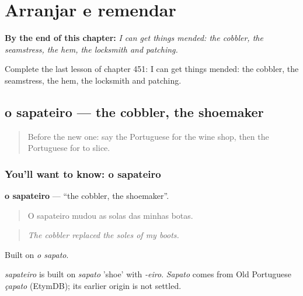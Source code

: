 
\chapter{Arranjar e remendar}
\label{ch:pt-arranjar-e-remendar}

\begin{chapteropening}
\textbf{By the end of this chapter:} \emph{I can get things mended: the cobbler, the seamstress, the hem, the locksmith and patching.}

Complete the last lesson of chapter 451: I can get things mended: the cobbler, the seamstress, the hem, the locksmith and patching.
\end{chapteropening}

\section[o sapateiro]{o sapateiro — the cobbler, the shoemaker}

\label{lesson:PT-C451-sapateiro}



\begin{quote}
Before the new one: say the Portuguese for the wine shop, then the Portuguese for to slice.
\end{quote}

\subsection*{You'll want to know: o sapateiro}
\textbf{o sapateiro} — \textquotedblleft{}the cobbler, the shoemaker\textquotedblright{}.

\begin{quote}
O sapateiro mudou as solas das minhas botas.
\end{quote}

\begin{quote}
\emph{The cobbler replaced the soles of my boots.}
\end{quote}

Built on \emph{o sapato}.

\begin{cousinweb}
\emph{sapateiro} is built on \emph{sapato} 'shoe' with \emph{-eiro}. \emph{Sapato} comes from Old Portuguese \emph{çapato} (EtymDB); its earlier origin is not settled.
\end{cousinweb}

